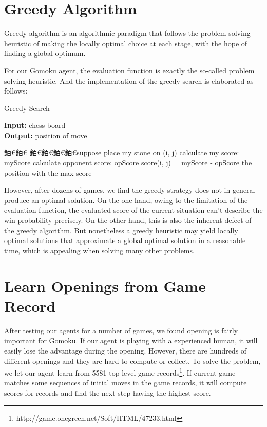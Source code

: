 \documentclass[12pt,a4paper]{article}
\begin{document}
\section{Greedy Algorithm}
Greedy algorithm is an algorithmic paradigm that follows the problem solving heuristic of making the locally optimal choice at each stage, with the hope of finding a global optimum.

For our Gomoku agent, the evaluation function is exactly the so-called problem solving heuristic.
And the implementation of the greedy search is elaborated as follows:
\begin{algorithm}[h]
\caption{Greedy Search}
\hspace*{0.02in} {\bf Input:}
chess board\\
\hspace*{0.02in} {\bf Output:}
position of move
\begin{algorithmic}
銆€銆€
銆€銆€銆€銆€\State suppose place my stone on (i, j)
		\State calculate my score: myScore
        		\State calculate opponent score: opScore
        		\State score(i, j) = myScore - opScore
	\EndIf
\EndFor
\Return the position with the max score
\end{algorithmic}
\end{algorithm}

%
%

However, after dozens of games, we find the greedy strategy does not in general produce an optimal solution. On the one hand, owing to the limitation of the evaluation function, the evaluated score of the current situation can't describe the win-probability precisely. On the other hand, this is also the inherent defect of the greedy algorithm. But nonetheless a greedy heuristic may yield locally optimal solutions that approximate a global optimal solution in a reasonable time, which is appealing when solving many other problems.


\section{Learn Openings from Game Record}
After testing our agents for a number of games, we found opening is fairly important for Gomoku. If our agent is playing with a experienced human, it will easily lose the advantage during the opening. However, there are hundreds of different openings and they are hard to compute or collect. To solve the problem, we let our agent learn from 5581 top-level game records\footnote{http://game.onegreen.net/Soft/HTML/47233.html}. If current game matches some sequences of initial moves in the game records, it will compute scores for records and find the next step having the highest score.
\end{document}
